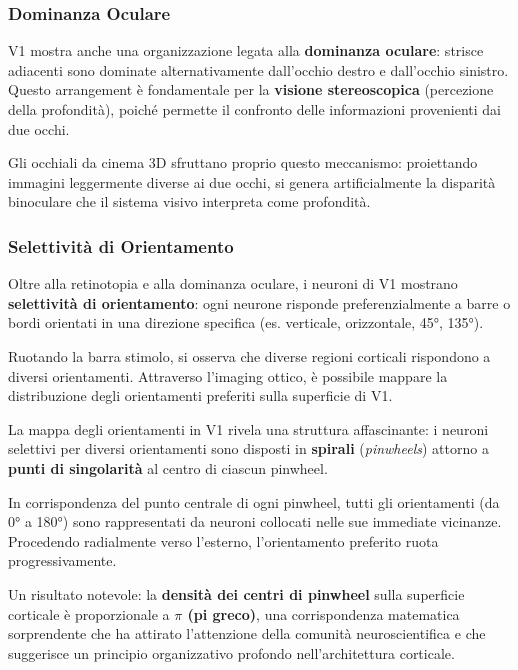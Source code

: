 \subsubsection{Dominanza Oculare}

V1 mostra anche una organizzazione legata alla \textbf{dominanza oculare}: strisce adiacenti sono dominate alternativamente dall'occhio destro e dall'occhio sinistro. Questo arrangement è fondamentale per la \textbf{visione stereoscopica} (percezione della profondità), poiché permette il confronto delle informazioni provenienti dai due occhi.

\begin{tcolorbox}[colback=gray!5, colframe=gray!40, arc=2mm, boxrule=0.5pt]
Gli occhiali da cinema 3D sfruttano proprio questo meccanismo: proiettando immagini leggermente diverse ai due occhi, si genera artificialmente la disparità binoculare che il sistema visivo interpreta come profondità.
\end{tcolorbox}

\subsubsection{Selettività di Orientamento}

Oltre alla retinotopia e alla dominanza oculare, i neuroni di V1 mostrano \textbf{selettività di orientamento}: ogni neurone risponde preferenzialmente a barre o bordi orientati in una direzione specifica (es. verticale, orizzontale, 45°, 135°).

Ruotando la barra stimolo, si osserva che diverse regioni corticali rispondono a diversi orientamenti. Attraverso l'imaging ottico, è possibile mappare la distribuzione degli orientamenti preferiti sulla superficie di V1.

La mappa degli orientamenti in V1 rivela una struttura affascinante: i neuroni selettivi per diversi orientamenti sono disposti in \textbf{spirali} (\textit{pinwheels}) attorno a \textbf{punti di singolarità} al centro di ciascun pinwheel.

In corrispondenza del punto centrale di ogni pinwheel, tutti gli orientamenti (da 0° a 180°) sono rappresentati da neuroni collocati nelle sue immediate vicinanze. Procedendo radialmente verso l'esterno, l'orientamento preferito ruota progressivamente.

Un risultato notevole: la \textbf{densità dei centri di pinwheel} sulla superficie corticale è proporzionale a \textbf{$\pi$ (pi greco)}, una corrispondenza matematica sorprendente che ha attirato l'attenzione della comunità neuroscientifica e che suggerisce un principio organizzativo profondo nell'architettura corticale.

